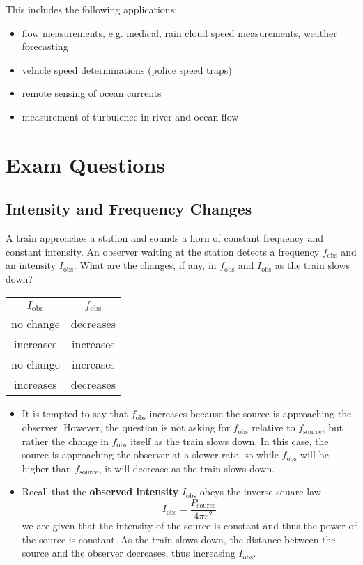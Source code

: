 \documentclass[a4paper,12pt]{article}
\let\oldsection\section
\renewcommand\section{\clearpage\oldsection}
\begin{document}
This includes the following applications:
\begin{itemize}
  \item flow measurements, e.g. medical, rain cloud speed measurements, weather forecasting
  \item vehicle speed determinations (police speed traps)
  \item remote sensing of ocean currents
  \item measurement of turbulence in river and ocean flow
\end{itemize}

\section{Exam Questions}

\subsection{Intensity and Frequency Changes}

A train approaches a station and sounds a horn of constant frequency and constant intensity. An observer waiting at the station detects a frequency $f_\text{obs}$ and an intensity $I_\text{obs}$. What are the changes, if any, in $f_\text{obs}$ and $I_\text{obs}$ as the train slows down?
\begin{table}[H]
  \centering
  \begin{tabular}{c | c}
    $I_\text{obs}$ & $f_\text{obs}$ \\
    \hline
    no change      & decreases      \\
    increases      & increases      \\
    no change      & increases      \\
    increases      & decreases
  \end{tabular}
\end{table}
\begin{itemize}
  \item It is tempted to say that $f_\text{obs}$ increases because the source is approaching the observer. However, the question is not asking for $f_\text{obs}$ relative to $f_\text{source}$, but rather the change in $f_\text{obs}$ itself as the train slows down. In this case, the source is approaching the observer at a slower rate, so while $f_\text{obs}$ will be higher than $f_\text{source}$, it will decrease as the train slows down.
  \item Recall that the \textbf{observed intensity} $I_\text{obs}$ obeys the inverse square law
        $$I_\text{obs} = \frac{P_\text{source}}{4\pi r^2}$$
        we are given that the intensity of the source is constant and thus the power of the source is constant. As the train slows down, the distance between the source and the observer decreases, thus increasing $I_\text{obs}$.
\end{itemize}
\end{document}
